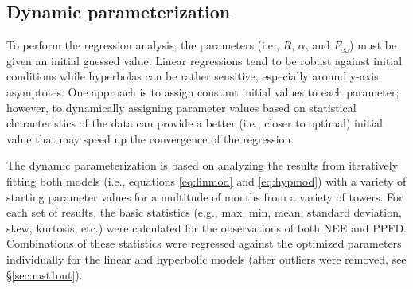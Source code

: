 \subsection{Dynamic parameterization}
To perform the regression analysis, the parameters (i.e., $R$, $\alpha$, and $F_\infty$) must be given an initial guessed value. 
Linear regressions tend to be robust against initial conditions while hyperbolas can be rather sensitive, especially around y-axis asymptotes.  
One approach is to assign constant initial values to each parameter; however, to dynamically assigning parameter values based on statistical characteristics of the data can provide a better (i.e., closer to optimal) initial value that may speed up the convergence of the regression. 

The dynamic parameterization is based on analyzing the results from iteratively fitting both models (i.e., equations \ref{eq:linmod} and \ref{eq:hypmod}) with a variety of starting parameter values for a multitude of months from a variety of towers.  
For each set of results, the basic statistics (e.g., max, min, mean, standard deviation, skew, kurtosis, etc.) were calculated for the observations of both NEE and PPFD.  
Combinations of these statistics were regressed against the optimized parameters individually for the linear and hyperbolic models (after outliers were removed, see \S \ref{sec:mst1out}).

